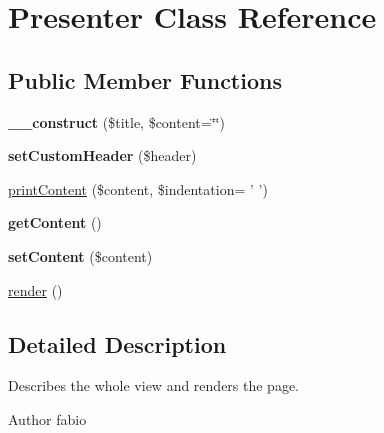 \hypertarget{classPresenter}{\section{Presenter Class Reference}
\label{classPresenter}
}
\subsection*{Public Member Functions}
\begin{DoxyCompactItemize}
\item 
\hypertarget{classPresenter_a24c04a54ce929bc12219f037a794d439}{{\bfseries \+\_\+\+\_\+construct} (\$title, \$content=\char`\"{}\char`\"{})}\label{classPresenter_a24c04a54ce929bc12219f037a794d439}

\item 
\hypertarget{classPresenter_a299e31916fc252227e369fc5efad77f9}{{\bfseries set\+Custom\+Header} (\$header)}\label{classPresenter_a299e31916fc252227e369fc5efad77f9}

\item 
\hyperlink{classPresenter_a327ab1b725813be28114753935b42cd4}{print\+Content} (\$content, \$indentation= ' ')
\item 
\hypertarget{classPresenter_a8a9d11db6633e0ebb898abd4580f8988}{{\bfseries get\+Content} ()}\label{classPresenter_a8a9d11db6633e0ebb898abd4580f8988}

\item 
\hypertarget{classPresenter_a9a7d0d294934548d13620baca0657087}{{\bfseries set\+Content} (\$content)}\label{classPresenter_a9a7d0d294934548d13620baca0657087}

\item 
\hyperlink{classPresenter_a2194a46cf6c23dd4e483f1ee63bc2236}{render} ()
\end{DoxyCompactItemize}


\subsection{Detailed Description}
Describes the whole view and renders the page.

\begin{DoxyAuthor}{Author}
fabio 
\end{DoxyAuthor}


